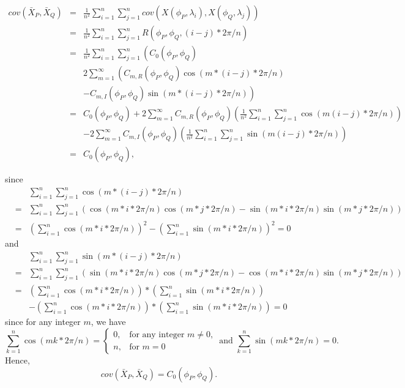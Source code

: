 	\begin{eqnarray*}
		cov(\bar{X}_P, \bar{X}_Q) &=&  \frac{1}{n^2}\sum_{i = 1}^n \sum_{j=1}^n cov(X(\phi_P, \lambda_i), X(\phi_Q, \lambda_j)) \\
		&=& \frac{1}{n^2}\sum_{i = 1}^n \sum_{j=1}^n R(\phi_P, \phi_Q, (i-j)*2\pi/n) \\
		&=& \frac{1}{n^2}\sum_{i = 1}^n \sum_{j=1}^n \left( C_0(\phi_P, \phi_Q) \right.\\
		& &  2\sum_{m=1}^\infty \left( C_{m, R}(\phi_P, \phi_Q) \cos(m*(i-j)*2\pi/n) \right. \\
		& & \left.- C_{m, I}(\phi_P, \phi_Q) \sin(m*(i-j)*2\pi/n) \right) \\
		&=& C_0(\phi_P, \phi_Q) + 2\sum_{m=1}^\infty C_{m, R}(\phi_P, \phi_Q) \left(\frac{1}{n^2}\sum_{i = 1}^n \sum_{j=1}^n \cos(m(i-j)*2\pi/n)\right) \\
		& & - 2\sum_{m=1}^\infty C_{m, I}(\phi_P, \phi_Q) \left(\frac{1}{n^2}\sum_{i = 1}^n \sum_{j=1}^n \sin(m(i-j)*2\pi/n)\right) \\
		&=& C_0(\phi_P, \phi_Q),
	\end{eqnarray*}
	
	since
	\begin{eqnarray*}
		& & \sum_{i = 1}^n \sum_{j=1}^n \cos(m*(i-j)*2\pi/n) \\
		&=& \sum_{i=1}^n \sum_{j=1}^n \left(\cos(m*i *2\pi/n)\cos(m*j*2\pi/n) - \sin(m*i *2\pi/n)\sin(m*j*2\pi/n) \right)\\
		&=& \left(\sum_{i=1}^n \cos(m*i *2\pi/n)\right)^2 - \left(\sum_{i=1}^n \sin(m*i *2\pi/n)\right)^2 = 0
	\end{eqnarray*}
	and
	\begin{eqnarray*}
		& & \sum_{i = 1}^n \sum_{j=1}^n \sin(m*(i-j)*2\pi/n) \\
		&=& \sum_{i=1}^n \sum_{j=1}^n \left(\sin(m*i *2\pi/n)\cos(m*j*2\pi/n) - \cos(m*i *2\pi/n)\sin(m*j*2\pi/n) \right)\\
		&=& \left(\sum_{i=1}^n \cos(m*i *2\pi/n)\right)* \left(\sum_{i=1}^n \sin(m*i *2\pi/n)\right) \\
		& & - \left(\sum_{i=1}^n \cos(m*i *2\pi/n)\right)* \left(\sum_{i=1}^n \sin(m*i *2\pi/n)\right) = 0
	\end{eqnarray*}
	since for any integer $m$, we have
	\[
		\sum_{k = 1}^{n} \cos(mk*2\pi/n) = \left\{\begin{array}{cc}
		0, & \mbox{for any integer $m \ne 0$,}  \\
		n, & \mbox{for $m = 0$}
		\end{array}
		\right. \mbox{ and }
		\sum_{k = 1}^{n} \sin(mk*2\pi/n) = 0.
	\]
	Hence,
	\[
		cov(\bar{X}_P, \bar{X}_Q) = C_0 (\phi_P, \phi_Q).
	\]
	
